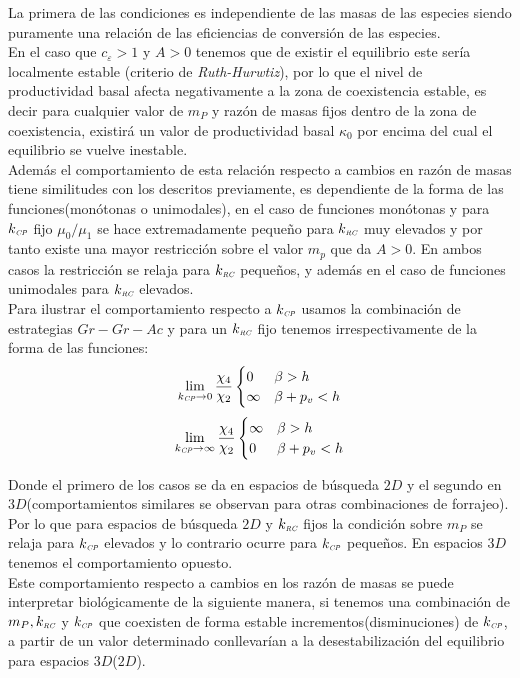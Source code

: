 La primera de las condiciones es independiente de las masas de las especies siendo puramente una relaci\'on de las eficiencias de conversi\'on de las especies. \\
En el caso que $c_\varepsilon > 1 $ y $ A  > 0$ tenemos que de existir el equilibrio este ser\'ia localmente estable (criterio de \emph{Ruth-Hurwtiz}), por lo que el nivel de productividad basal afecta negativamente a la zona de coexistencia estable, es decir para cualquier valor de $m_P$ y raz\'on de masas fijos dentro de la zona de coexistencia, existir\'a un valor de productividad basal $\kappa_0$ por encima del cual el equilibrio se vuelve inestable.\\
Adem\'as el comportamiento de esta relaci\'on respecto a cambios en raz\'on de masas tiene similitudes con los descritos previamente, es dependiente de la forma de las funciones(mon\'otonas o unimodales), en el caso de funciones mon\'otonas y para $k_{\textit{\tiny CP}}$ fijo $\mu_0/\mu_1$ se hace extremadamente peque\~no para $k_{\textit{\tiny RC}}$ muy elevados y por tanto existe una mayor restricci\'on sobre el valor $m_p$ que da $A>0$. En ambos casos la restricci\'on se relaja para $k_{\textit{\tiny RC}}$ peque\~nos, y adem\'as en el caso de funciones unimodales para $k_{\textit{\tiny RC}}$ elevados.\\
Para ilustrar el comportamiento respecto a $k_{\textit{\tiny CP}}$ usamos la combinaci\'on de estrategias $Gr-Gr-Ac$ y para un $k_{\textit{\tiny RC}}$ fijo tenemos irrespectivamente de la forma de las funciones:
\begin{equation}
  \lim_{k_{\textit{\tiny CP}} \to 0} \frac{\chi_4}{\chi_2} 
  \begin{cases}
     0 & \beta > h \\
     \infty & \beta + p_v < h\\ 
  \end{cases}
\end{equation}
\begin{equation}
  \lim_{k_{\textit{\tiny CP}} \to \infty} \frac{\chi_4}{\chi_2}
  \begin{cases}
    \infty & \beta > h\\ 
    0 & \beta + p_v < h\\
    \end{cases}
\end{equation}

Donde el primero de los casos se da en espacios de b\'usqueda $2D$ y el segundo en $3D$(comportamientos similares se observan para otras combinaciones de forrajeo). Por lo que para espacios de b\'usqueda $2D$ y $k_{\textit{\tiny RC}}$ fijos la condici\'on sobre $m_P$ se relaja para $k_{\textit{\tiny CP}}$ elevados y lo contrario ocurre para $k_{\textit{\tiny CP}}$ peque\~nos. En espacios $3D$ tenemos el comportamiento opuesto.\\
Este comportamiento respecto a cambios en los raz\'on de masas se puede interpretar biol\'ogicamente de la siguiente manera, si tenemos una combinaci\'on de $m_P,k_{\textit{\tiny RC}}$ y $k_{\textit{\tiny CP}}$ que coexisten de forma estable incrementos(disminuciones) de $k_{\textit{\tiny CP}}$, a partir de un valor determinado conllevar\'ian a la desestabilizaci\'on del equilibrio para espacios $3D$($2D$).\\

